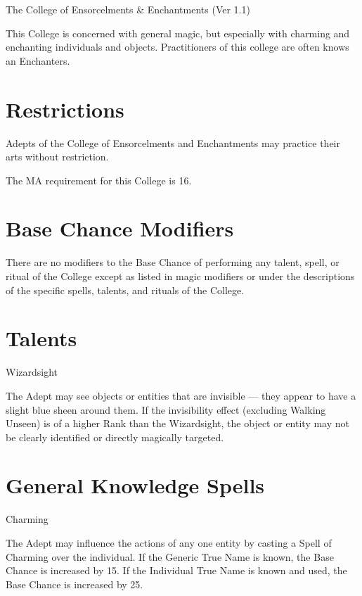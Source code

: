 \begin{Chapter}{The College of Ensorcelments \& Enchantments (Ver 1.1)}

This College is concerned with general magic, but especially with
charming and enchanting individuals and objects.  Practitioners of
this college are often knows an Enchanters.


\section{Restrictions}

Adepts of the College of Ensorcelments and Enchantments may practice
their arts without restriction.

The MA requirement for this College is 16. 


\section{Base Chance Modifiers}

There are no modifiers to the Base Chance of performing any talent,
spell, or ritual of the College except as listed in magic modifiers or
under the descriptions of the specific spells, talents, and rituals of
the College.


\section{Talents}

\begin{talent}[T-1]{Wizardsight}

\begin{effects}
The Adept may see objects or entities that are invisible — they appear
to have a slight blue sheen around them.  If the invisibility effect
(excluding Walking Unseen) is of a higher Rank than the Wizardsight,
the object or entity may not be clearly identified or directly
magically targeted.
\end{effects}
\end{talent}


\section{General Knowledge Spells}

\begin{spell}[G-1]{Charming}
\begin{effects}
The Adept may influence the actions of any one entity by casting a
Spell of Charming over the individual. If the Generic True Name is
known, the Base Chance is increased by 15. If the Individual True Name
is known and used, the Base Chance is increased by 25.


\end{effects}
\end{spell}
\end{Chapter}
